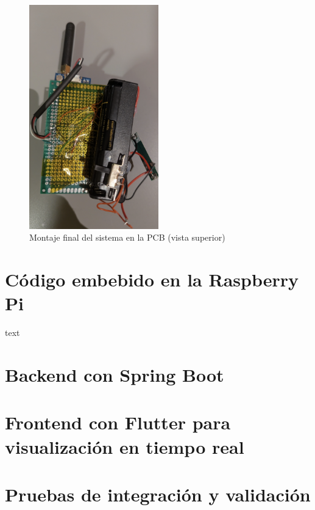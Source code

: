 \begin{figure}[H]
    \centering
    \includegraphics[width=0.5\textwidth]{Imagenes/Bitmap/pcb_montaje_trasero}
    \caption{Montaje final del sistema en la PCB (vista superior)}
    \label{fig:montaje_trasero}
\end{figure}


\section{Código embebido en la Raspberry Pi}
text

\section{Backend con Spring Boot}


\section{Frontend con Flutter para visualización en tiempo real}


\section{Pruebas de integración y validación}

